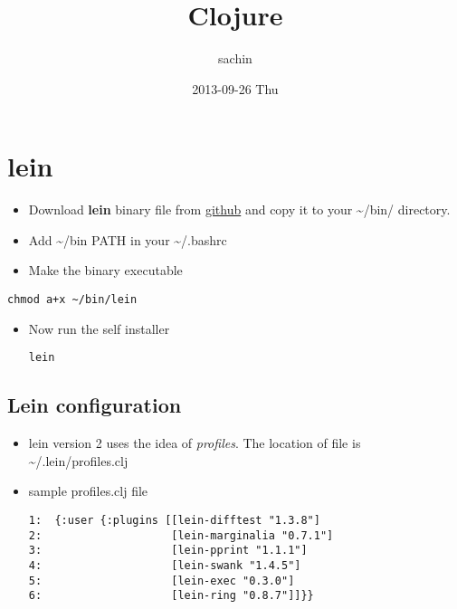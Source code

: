 \documentclass[11pt]{article}
\title{Clojure}
\author{sachin}
\date{2013-09-26 Thu}
\begin{document}
\maketitle

\setcounter{tocdepth}{3}
\tableofcontents
\vspace*{1cm}

\section{lein}
\label{sec-1}

\begin{itemize}
\item Download \textbf{lein} binary file from \href{https://raw.github.com/technomancy/leiningen/stable/bin/lein}{github} and copy it to your
     \~{}/bin/ directory.
\item Add \~{}/bin PATH in your \~{}/.bashrc
\item Make the binary executable
\end{itemize}

\begin{verbatim}
chmod a+x ~/bin/lein
\end{verbatim}

\begin{itemize}
\item Now run the self installer

\begin{verbatim}
lein
\end{verbatim}
\end{itemize}
\subsection{Lein configuration}
\label{sec-1-1}

\begin{itemize}
\item lein version 2 uses the idea of \emph{profiles}. The location of file
      is \~{}/.lein/profiles.clj
\item sample profiles.clj file

\begin{verbatim}
1:  {:user {:plugins [[lein-difftest "1.3.8"]
2:                    [lein-marginalia "0.7.1"]
3:                    [lein-pprint "1.1.1"]
4:                    [lein-swank "1.4.5"]
5:                    [lein-exec "0.3.0"]
6:                    [lein-ring "0.8.7"]]}}
\end{verbatim}
\end{itemize}
\end{document}
